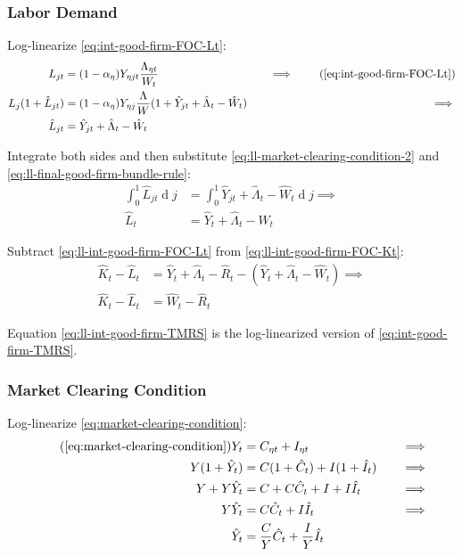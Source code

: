 \documentclass[
	12pt,
	]{article}
\numberwithin{equation}{section}
\DeclareMathOperator{\dif}{d}
\theoremstyle{definition}
\theoremstyle{plain}
\theoremstyle{plain}
\theoremstyle{plain}
\begin{document}

\subsubsection{Labor Demand}

Log-linearize \ref{eq:int-good-firm-FOC-Lt}:
\begin{alignat}{2}
	L_{jt} &= (1-{\alpha_\eta}) Y_{\eta jt} \frac{\Lambda_{\eta t}}{W_t} &\implies \tag{\ref{eq:int-good-firm-FOC-Lt}} \\
	L_j (1+ \hat{L}_{jt}) &= (1-{\alpha_\eta}) Y_{\eta j} \frac{\Lambda}{W} (1+ \hat{Y}_{jt} +\hat{\Lambda}_t -\hat{W}_t) \quad &\implies \nonumber \\
	\hat{L}_{jt} &= \hat{Y}_{jt} +\hat{\Lambda}_t -\hat{W}_t \nonumber
\end{alignat}

Integrate both sides and then substitute \ref{eq:ll-market-clearing-condition-2} and \ref{eq:ll-final-good-firm-bundle-rule}:
\begin{align}
	\int_{0}^{1} \hat{L}_{jt} \dif j &= \int_{0}^{1} \hat{Y}_{jt} + \hat{\Lambda}_t - \hat{W}_t \dif j \implies \nonumber \\
	\hat{L}_t &= \hat{Y}_t + \hat{\Lambda}_t - \hat{W}_t
	\label{eq:ll-int-good-firm-FOC-Lt}
\end{align}

Subtract \ref{eq:ll-int-good-firm-FOC-Lt} from \ref{eq:ll-int-good-firm-FOC-Kt}:
\begin{align}
	\hat{K}_t - \hat{L}_t &= \hat{Y}_t + \hat{\Lambda}_t - \hat{R}_t - (\hat{Y}_t + \hat{\Lambda}_t - \hat{W}_t) \implies \nonumber \\
	\hat{K}_t - \hat{L}_t &= \hat{W}_t - \hat{R}_t \label{eq:ll-int-good-firm-TMRS}
\end{align}

Equation \ref{eq:ll-int-good-firm-TMRS} is the log-linearized version of \ref{eq:int-good-firm-TMRS}.


\subsubsection{Market Clearing Condition}

Log-linearize \ref{eq:market-clearing-condition}:
\begin{alignat}{2}
	\tag{\ref{eq:market-clearing-condition}}
	Y_t &= C_{\eta t} + I_{\eta t} &\implies \\
	Y (1+ \hat{Y}_t) &= C(1+ \hat{C}_t) + I (1+ \hat{I}_t) \quad &\implies \nonumber \\
	Y + Y\hat{Y}_t &= C + C\hat{C}_t + I + I\hat{I}_t &\implies \nonumber  \\
	Y\hat{Y}_t &= C\hat{C}_t + I\hat{I}_t &\implies \nonumber \\
	\hat{Y}_t &= \frac{C}{Y}\hat{C}_t + \frac{I}{Y}\hat{I}_t  \label{eq:ll-market-clearing-condition}
\end{alignat}
\end{document}
